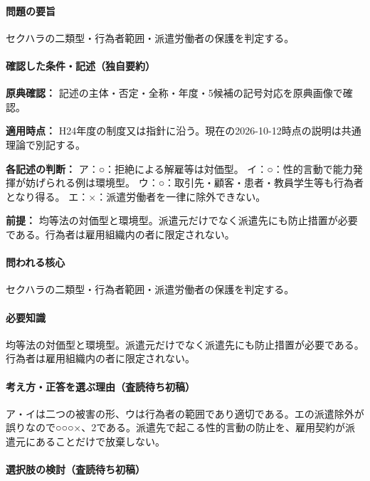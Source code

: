 \paragraph{問題の要旨} セクハラの二類型・行為者範囲・派遣労働者の保護を判定する。

\paragraph{確認した条件・記述（独自要約）}\mbox{}\par

\noindent\textbf{原典確認：} 記述の主体・否定・全称・年度・5候補の記号対応を原典画像で確認。\par

\noindent\textbf{適用時点：} H24年度の制度又は指針に沿う。現在の2026-10-12時点の説明は共通理論で別記する。\par

\noindent\textbf{各記述の判断：} ア：○：拒絶による解雇等は対価型。 イ：○：性的言動で能力発揮が妨げられる例は環境型。 ウ：○：取引先・顧客・患者・教員学生等も行為者となり得る。 エ：×：派遣労働者を一律に除外できない。\par

\noindent\textbf{前提：} 均等法の対価型と環境型。派遣元だけでなく派遣先にも防止措置が必要である。行為者は雇用組織内の者に限定されない。\par

\paragraph{問われる核心} セクハラの二類型・行為者範囲・派遣労働者の保護を判定する。

\paragraph{必要知識} 均等法の対価型と環境型。派遣元だけでなく派遣先にも防止措置が必要である。行為者は雇用組織内の者に限定されない。

\paragraph{考え方・正答を選ぶ理由（査読待ち初稿）} ア・イは二つの被害の形、ウは行為者の範囲であり適切である。エの派遣除外が誤りなので○○○×、2である。派遣先で起こる性的言動の防止を、雇用契約が派遣元にあることだけで放棄しない。

\paragraph{選択肢の検討（査読待ち初稿）}\mbox{}\par

